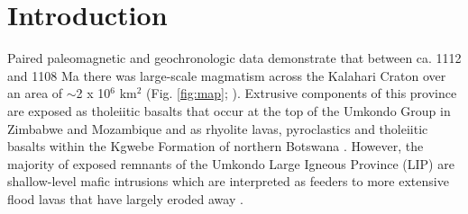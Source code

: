 \documentclass[11pt,letterpaper]{article}
\begin{document}
\section*{Introduction}
Paired paleomagnetic and geochronologic data demonstrate that between ca. 1112 and 1108 Ma there was large-scale magmatism across the Kalahari Craton over an area of $\sim$2 x 10$^6$ km$^2$ (Fig. \ref{fig:map}; \citealp{Hanson2004a}). Extrusive components of this province are exposed as tholeiitic basalts that occur at the top of the Umkondo Group in Zimbabwe and Mozambique \citep{Swift1962a, McElhinny1966a, Moabi2015a} and as rhyolite lavas, pyroclastics and tholeiitic basalts within the Kgwebe Formation of northern Botswana \citep{Modie1996a, Hanson2006a}. However, the majority of exposed remnants of the Umkondo Large Igneous Province (LIP) are shallow-level mafic intrusions \citep{Hanson2006a, Kock2014a} which are interpreted as feeders to more extensive flood lavas that have largely eroded away \citep{Hanson2004a}.
\end{document}
